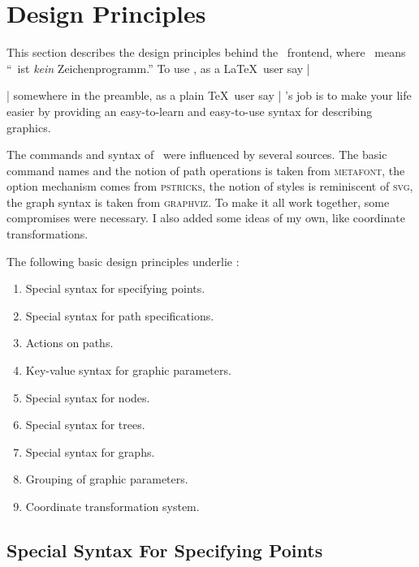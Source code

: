 %
%
%

\section{Design Principles}

This section describes the design principles behind the \tikzname\
frontend, where \tikzname\ means ``\tikzname\ ist \emph{kein}
Zeichenprogramm.'' To use \tikzname, as a \LaTeX\ user say
|\usepackage{tikz}| somewhere in the preamble, as a plain \TeX\ user
say | \tikzname's job is to make your life easier by
providing an easy-to-learn and easy-to-use syntax for describing
graphics.

The commands and syntax of \tikzname\ were influenced by several
sources. The basic command names and the notion of  path operations is
taken from \textsc{metafont}, the option mechanism comes from
\textsc{pstricks}, the notion of styles is reminiscent of
\textsc{svg}, the graph syntax is taken from \textsc{graphviz}. To make it
all work together, some compromises were necessary. I also added some
ideas of my own, like coordinate transformations.

The following basic design principles underlie \tikzname:
\begin{enumerate}
\item Special syntax for specifying points.
\item Special syntax for path specifications.
\item Actions on paths.
\item Key-value syntax for graphic parameters.
\item Special syntax for nodes.
\item Special syntax for trees.
\item Special syntax for graphs.
\item Grouping of graphic parameters.
\item Coordinate transformation system.
\end{enumerate}



\subsection{Special Syntax For Specifying Points}

